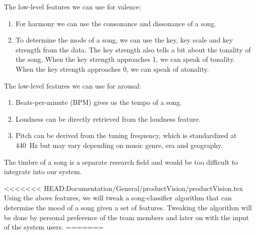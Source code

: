 \documentclass[10pt,a4paper]{article}
\begin{document}
The low-level features we can use for valence:
\begin{enumerate}
\item For harmony we can use the consonance and dissonance of a song.
\item To determine the mode of a song, we can use the key, key scale and key strength from the data.
The key strength also tells a bit about the tonality of the song.
When the key strength approaches 1, we can speak of tonality. When the key strength approaches 0, we can speak of atonality.
\end{enumerate}
The low-level features we can use for arousal:
\begin{enumerate}
\item Beats-per-minute (BPM) gives us the tempo of a song.
\item Loudness can be directly retrieved from the loudness feature.
\item Pitch can be derived from the tuning frequency, which is standardized at \SI{440}{\hertz} but may vary depending on music genre, era and geography.
\end{enumerate}

The timbre of a song is a separate research field and would be too difficult to integrate into our system.

<<<<<<< HEAD:Documentation/General/productVision/productVision.tex
Using the above features, we will tweak a song-classifier algorithm that can determine the mood of a song given a set of features.
Tweaking the algorithm will be done by personal preference of the team members and later on with the input of the system users.
=======
%
%
{}

\end{document}
